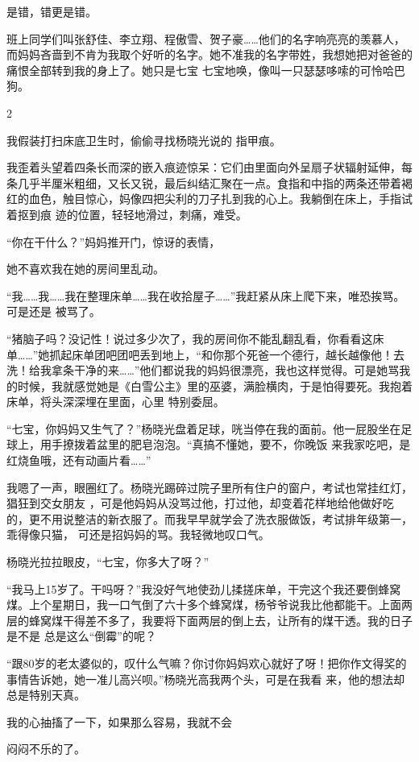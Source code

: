 \documentclass{article}
\begin{document}
\newpage
是错，错更是错。 

班上同学们叫张舒佳、李立翔、程傲雪、贺子豪……他们的名字响亮亮的羡慕人，而妈妈吝啬到不肯为我取个好听的名字。她不准我的名字带姓，我想她把对爸爸的痛恨全部转到我的身上了。她只是七宝
七宝地唤，像叫一只瑟瑟哆嗦的可怜哈巴狗。 


2 

我假装打扫床底卫生时，偷偷寻找杨晓光说的
指甲痕。 

我歪着头望着四条长而深的嵌入痕迹惊呆：它们由里面向外呈扇子状辐射延伸，每条几乎半厘米粗细，又长又锐，最后纠结汇聚在一点。食指和中指的两条还带着褐红的血色，触目惊心，妈像四把尖利的刀子扎到我的心上。我躺倒在床上，手指试着抠到痕
迹的位置，轻轻地滑过，刺痛，难受。 

“你在干什么？”妈妈推开门，惊讶的表情，

\newpage
她不喜欢我在她的房间里乱动。 

“我……我……我在整理床单……我在收拾屋子……”我赶紧从床上爬下来，唯恐挨骂。可是还是
被骂了。 

“猪脑子吗？没记性！说过多少次了，我的房间你不能乱翻乱看，你看看这床单……”她抓起床单团吧团吧丢到地上，“和你那个死爸一个德行，越长越像他！去洗！给我拿条干净的来……”他们都说我的妈妈很漂亮，我也这样觉得。可是她骂我的时候，我就感觉她是《白雪公主》里的巫婆，满脸横肉，于是怕得要死。我抱着床单，将头深深埋在里面，心里
特别委屈。 

“七宝，你妈妈又生气了？”杨晓光盘着足球，咣当停在我的面前。他一屁股坐在足球上，用手撩拨着盆里的肥皂泡泡。“真搞不懂她，要不，你晚饭
来我家吃吧，是红烧鱼哦，还有动画片看……” 

我嗯了一声，眼圈红了。杨晓光踢碎过院子里所有住户的窗户，考试也常挂红灯，猖狂到交女朋友
\newpage
，可是他妈妈从没骂过他，打过他，却变着花样地给他做好吃的，更不用说整洁的新衣服了。而我早早就学会了洗衣服做饭，考试排年级第一，乖得像只猫，
可还是招妈妈的骂。我轻微地叹口气。 


杨晓光拉拉眼皮，“七宝，你多大了呀？” 

“我马上15岁了。干吗呀？”我没好气地使劲儿揉搓床单，干完这个我还要倒蜂窝煤。上个星期日，我一口气倒了六十多个蜂窝煤，杨爷爷说我比他都能干。上面两层的蜂窝煤干得差不多了，我要将下面两层的倒上去，让所有的煤干透。我的日子是不是
总是这么“倒霉”的呢？ 

“跟80岁的老太婆似的，叹什么气嘛？你讨你妈妈欢心就好了呀！把你作文得奖的事情告诉她，她一准儿高兴呗。”杨晓光高我两个头，可是在我看
来，他的想法却总是特别天真。 

我的心抽搐了一下，如果那么容易，我就不会

\newpage
闷闷不乐的了。 
\end{document}
